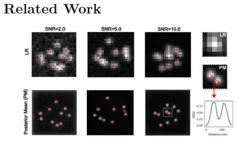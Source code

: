 \documentclass{article}
\begin{document}
\section{Related Work}


\begin{figure}
\includegraphics[scale=0.6]{Samples.png}
\end{figure}
\end{document}
